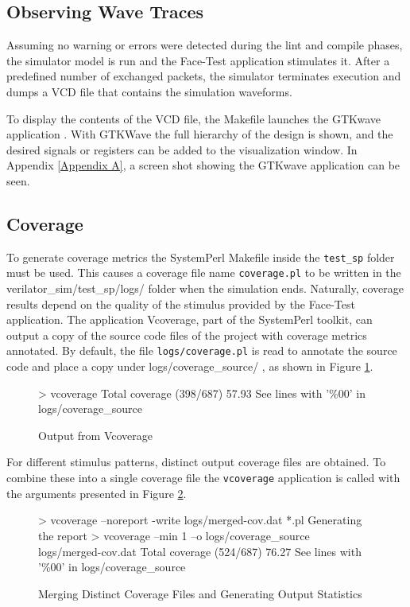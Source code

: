 \documentclass[defaultstyle,10pt,master,Helvetica]{thesis}
\begin{document}
\subsection{Observing Wave Traces}

Assuming no warning or errors were detected during the lint and compile phases, the simulator model is run and the Face-Test application stimulates it. After a predefined number of exchanged packets, the simulator terminates execution and dumps a VCD file that contains the simulation waveforms.

To display the contents of the VCD file, the Makefile launches the GTKwave application \cite{gtkwave}. With GTKWave the full hierarchy of the design is shown, and the desired signals or registers can be added to the visualization window. In Appendix \ref{Appendix A}, a screen shot showing the GTKwave application can be seen.


\subsection{Coverage}

To generate coverage metrics the SystemPerl Makefile inside the {\tt test\_sp} folder must be used. This causes a coverage file name {\tt coverage.pl} to be written in the {verilator\_sim/test\_sp/logs/} folder when the simulation ends. Naturally, coverage results depend on the quality of the stimulus provided by the Face-Test application.
\clearpage
The application Vcoverage, part of the SystemPerl toolkit, can output a copy of the source code files of the project with coverage metrics annotated. By default, the file {\tt logs/coverage.pl} is read to annotate the source code and place a copy under {logs/coverage\_source/} , as shown in Figure \ref{fig:vcov_outp}.

\begin{figure}[h]
\begin{boxedverbatim}
> vcoverage
Total coverage (398/687) 57.93%
See lines with '\%00' in logs/coverage\_source
\end{boxedverbatim}
\caption{Output from Vcoverage}
\label{fig:vcov_outp}
\end{figure}

For different stimulus patterns, distinct output coverage files are obtained. To combine these into a single coverage file the {\tt vcoverage} application is called with the arguments presented in Figure \ref{fig:vcov_join}.

\begin{figure}[h]
\begin{boxedverbatim}
> vcoverage --noreport -write logs/merged-cov.dat *.pl
Generating the report
> vcoverage --min 1 --o logs/coverage_source logs/merged-cov.dat 
Total coverage (524/687) 76.27%
See lines with '\%00' in logs/coverage\_source
\end{boxedverbatim}
\caption{Merging Distinct Coverage Files and Generating Output Statistics}
\label{fig:vcov_join}
\end{figure}
\end{document}
